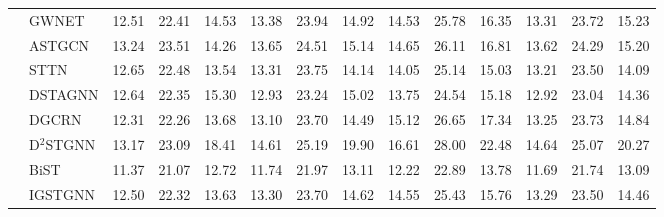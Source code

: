 \begin{table}
\begin{tabular}{llrrrrrrrrrrrr}
 & GWNET & 12.51 & 22.41 & 14.53 & 13.38 & 23.94 & 14.92 & 14.53 & 25.78 & 16.35 & 13.31 & 23.72 & 15.23 \\
 & ASTGCN & 13.24 & 23.51 & 14.26 & 13.65 & 24.51 & 15.14 & 14.65 & 26.11 & 16.81 & 13.62 & 24.29 & 15.20 \\
 & STTN & 12.65 & 22.48 & 13.54 & 13.31 & 23.75 & 14.14 & 14.05 & 25.14 & 15.03 & 13.21 & 23.50 & 14.09 \\
 & DSTAGNN & 12.64 & 22.35 & 15.30 & 12.93 & 23.24 & 15.02 & 13.75 & 24.54 & 15.18 & 12.92 & 23.04 & 14.36 \\
 & DGCRN & 12.31 & 22.26 & 13.68 & 13.10 & 23.70 & 14.49 & 15.12 & 26.65 & 17.34 & 13.25 & 23.73 & 14.84 \\
 & D$^2$STGNN & 13.17 & 23.09 & 18.41 & 14.61 & 25.19 & 19.90 & 16.61 & 28.00 & 22.48 & 14.64 & 25.07 & 20.27 \\
 & BiST & 11.37 & 21.07 & 12.72 & 11.74 & 21.97 & 13.11 & 12.22 & 22.89 & 13.78 & 11.69 & 21.74 & 13.09 \\
 & IGSTGNN & 12.50 & 22.32 & 13.63 & 13.30 & 23.70 & 14.62 & 14.55 & 25.43 & 15.76 & 13.29 & 23.50 & 14.46 \\
\bottomrule
\end{tabular}
\end{table}

